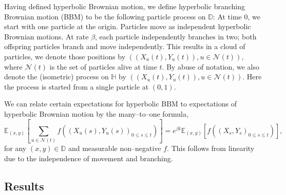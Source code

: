 \documentclass{article}
\theoremstyle{definition}
\numberwithin{equation}{section}
\numberwithin{thm}{section}
\newcommand*{\EE}{\ensuremath{\mathbb{E}}}	        	%
\newcommand*{\DD}{\ensuremath{\mathbb{D}}}	        	%
\newcommand*{\HH}{\ensuremath{\mathbb{H}}}	        	%
\begin{document}
Having defined hyperbolic Brownian motion, we define hyperbolic branching Brownian motion (BBM) to be the following particle process on $\DD$: At time $0$, we start with one particle at the origin. Particles move as independent hyperbolic Brownian motions. At rate $\beta$, each particle independently branches {in} two; both offspring particles branch and move independently. This results in a cloud of particles, we denote {those positions} by $((X_u(t),Y_u(t)),u\in \mathcal{N}(t) ),$ where $\mathcal{N}(t)$ is the set of particles alive at time $t$. By abuse of notation, we also denote the (isometric) process on $\HH$ by $((X_u(t),Y_u(t)),u\in \mathcal{N}(t) )$. Here the process is started from a single particle at $(0,1)$.

We can relate certain expectations for hyperbolic BBM to expectations of hyperbolic Brownian motion by the many--to--one formula,
\begin{equation}\label{eq:many-to-one}
    \EE_{(x,y)}\left[\sum_{u\in \mathcal{N}(t)      } f((X_u(s),Y_u(s))_{0\leq s\leq t})\right] = e^{\beta t}\EE_{(x,y)}\left[ f((X_s,Y_s)_{0\leq s\leq t})\right],
\end{equation}
for any $(x,y)\in \DD$ and measurable non--negative $f$. This follows from linearity due to the independence of movement and branching. 

\subsection{Results}
\end{document}
